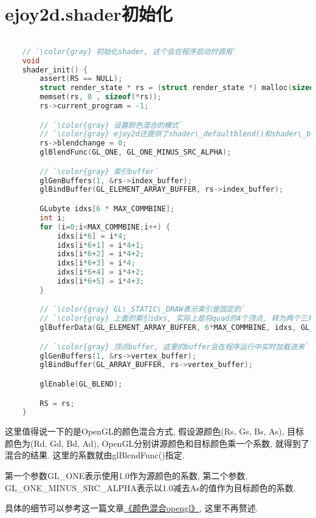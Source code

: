 \section {\ZHH ejoy2d.shader初始化} {

    \begin{lstlisting}[language=C]

    // `\color{gray} 初始化shader, 这个会在程序启动时调用`
    void
    shader_init() {
        assert(RS == NULL);
        struct render_state * rs = (struct render_state *) malloc(sizeof(*rs));
        memset(rs, 0 , sizeof(*rs));
        rs->current_program = -1;

        // `\color{gray} 设置颜色混合的模式`
        // `\color{gray} ejoy2d还提供了shader\_defaultblend()和shader\_blend()接口来操作blend方式`
        rs->blendchange = 0;
        glBlendFunc(GL_ONE, GL_ONE_MINUS_SRC_ALPHA);

        // `\color{gray} 索引buffer`
        glGenBuffers(1, &rs->index_buffer);
        glBindBuffer(GL_ELEMENT_ARRAY_BUFFER, rs->index_buffer);

        GLubyte idxs[6 * MAX_COMMBINE];
        int i;
        for (i=0;i<MAX_COMMBINE;i++) {
            idxs[i*6] = i*4;
            idxs[i*6+1] = i*4+1;
            idxs[i*6+2] = i*4+2;
            idxs[i*6+3] = i*4;
            idxs[i*6+4] = i*4+2;
            idxs[i*6+5] = i*4+3;
        }

        // `\color{gray} GL\_STATIC\_DRAW表示索引是固定的`
        // `\color{gray} 上面的索引idxs, 实际上是将quad的4个顶点, 转为两个三角面, 节约了2个冗余顶点`
        glBufferData(GL_ELEMENT_ARRAY_BUFFER, 6*MAX_COMMBINE, idxs, GL_STATIC_DRAW);

        // `\color{gray} 顶点buffer, 这里的buffer会在程序运行中实时加载进来`
        glGenBuffers(1, &rs->vertex_buffer);
        glBindBuffer(GL_ARRAY_BUFFER, rs->vertex_buffer);

        glEnable(GL_BLEND);

        RS = rs;
    }

    \end{lstlisting} \par

    {这里值得说一下的是OpenGL的颜色混合方式, 假设源颜色(Rs, Gs, Bs, As), 目标颜色为(Rd, Gd, Bd, Ad), OpenGL分别讲源颜色和目标颜色乘一个系数, 就得到了混合的结果. 这里的系数就由glBlendFunc()指定. }\par

    {第一个参数GL\_ONE表示使用1.0作为源颜色的系数, 第二个参数, GL\_ONE\_MINUS\_SRC\_ALPHA表示以1.0减去As的值作为目标颜色的系数. } \par

    {具体的细节可以参考这一篇文章\href{http://blog.csdn.net/aurora_mylove/article/details/1700540}{《颜色混合opengl》}, 这里不再赘述. }\par

}

